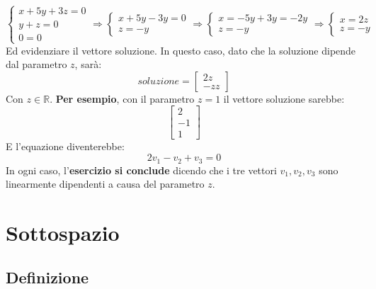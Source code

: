 \documentclass[a4paper]{article}
\begin{document}
	\begin{equation*}
		\begin{cases}
			x + 5y + 3z = 0 \\
			y + z = 0		\\
			0 = 0
		\end{cases} \Rightarrow
		\begin{cases}
			x + 5y - 3y = 0 \\
			z = -y
		\end{cases} \Rightarrow
		\begin{cases}
			x = - 5y + 3y = -2y \\
			z = -y
		\end{cases} \Rightarrow
		\begin{cases}
			x = 2z \\
			z = -y
		\end{cases}
	\end{equation*}
	Ed evidenziare il vettore soluzione. In questo caso, dato che la soluzione dipende dal parametro $z$, sarà:
	\begin{equation*}
		soluzione = \begin{bmatrix}
			2z \\
			-z
			z
		\end{bmatrix}
	\end{equation*}
	Con $z \in \mathbb{R}$. \textbf{Per esempio}, con il parametro $z = 1$ il vettore soluzione sarebbe:
	\begin{equation*}
		\begin{bmatrix}
			2 \\
			-1\\
			1
		\end{bmatrix}
	\end{equation*}
	E l'equazione diventerebbe:
	\begin{equation*}
		2v_{1} - v_{2} + v_{3} = 0
	\end{equation*}
	In ogni caso, l'\textbf{esercizio si conclude} dicendo che i tre vettori $v_{1}, v_{2}, v_{3}$ sono linearmente dipendenti a causa del parametro $z$.\newpage
	
	\section{Sottospazio}
	
	\subsection{Definizione}
	
\end{document}
